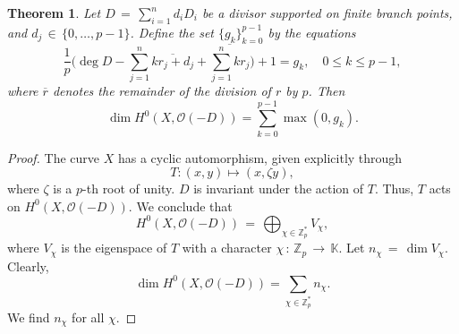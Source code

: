 \documentclass[]{amsart}
\numberwithin{equation}{section}
\newtheorem{theorem}{Theorem}[section]
\begin{document}
\begin{theorem}\label{dimensionformula}
Let $D\,{=}\,\sum_{i=1}^n d_i D_i$ be a divisor supported on finite branch points, 
and $d_j \,{\in}\, \{0,\dots,p-1\}$. 
Define the set  $\{g_k\}_{k=0}^{p-1}$ by the equations 
\begin{equation}
\frac{1}{p}\bigg(\deg D-\sum_{j=1}^n \overline{k r_j + d_j}
+\overline{\sum_{j=1}^n k r_j}\bigg) +1=g_k,\quad   0\leq k\leq p-1,
\end{equation}
where $\overline{r}$ denotes the remainder of the division of $r$ by $p$. Then 
\begin{equation}
\dim H^{0}(X,\mathcal{O}(-D))=\sum_{k=0}^{p-1} \max(0,g_k).
\end{equation}
\end{theorem}
\begin{proof}
The curve $X$ has a cyclic automorphism, given explicitly through 
$$T:(x,y)\mapsto (x,\zeta y),$$ 
where $\zeta$ is a $p$-th root of unity. 
$D$ is invariant under the action of $T$. Thus,  $T$ acts on $H^{0}(X,\mathcal{O}(-D))$.
We conclude that 
$$H^{0}(X,\mathcal{O}(-D)) \,{=}\,\bigoplus_{\chi\in \mathbb{Z}_p^{\ast}} V_{\chi},$$
where $V_{\chi}$ is the eigenspace of $T$ with a character 
$\chi\,{:}\,{\mathbb{Z}_p} \,{\to}\, \mathbb{K}$. 
Let $n_{\chi}\,{=}\,\dim V_{\chi}$. Clearly, 
$$\dim H^{0}(X,\mathcal{O}(-D)) = \sum_{\chi\in \mathbb{Z}_p^{\ast}} n_{\chi}.$$ 
We  find $n_{\chi}$ for all $\chi$.


\end{proof}
\end{document}
